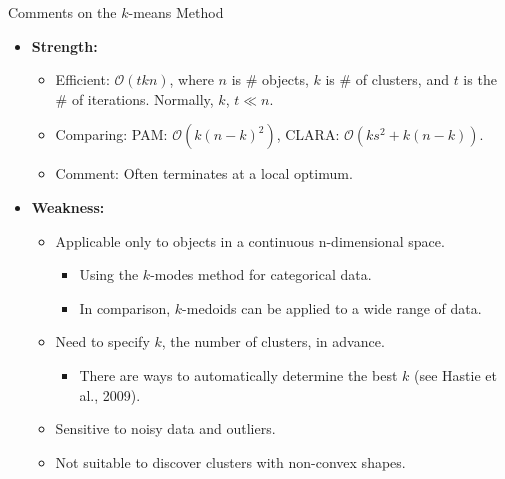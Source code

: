 \begin{frame}{Comments on the $k$-means Method}
	\begin{itemize}
		\item \textbf{Strength:}
		      \begin{itemize}
			      \item Efficient: $\mathcal{O}(tkn)$, where $n$ is $\#$ objects, $k$
			            is $\#$ of clusters, and $t$ is the $\#$ of iterations. Normally,
			            $k$, $t \ll n$.
			      \item Comparing: PAM: $\mathcal{O}(k(n-k)^2)$, CLARA:
			            $\mathcal{O}(ks^2 + k(n-k))$.
			      \item Comment: Often terminates at a local optimum.
		      \end{itemize}
		\item \textbf{Weakness:}
		      \begin{itemize}
			      \item Applicable only to objects in a continuous n-dimensional
			            space.
			            \begin{itemize}
				            \item Using the $k$-modes method for categorical data.
				            \item In comparison, $k$-medoids can be applied to a wide range
				                  of data.
			            \end{itemize}
			      \item Need to specify $k$, the number of clusters, in advance.
			            \begin{itemize}
				            \item There are ways to automatically determine the best $k$
				                  (see Hastie et al., 2009).
			            \end{itemize}
			      \item Sensitive to noisy data and outliers.
			      \item Not suitable to discover clusters with non-convex shapes.
		      \end{itemize}
	\end{itemize}
\end{frame}

